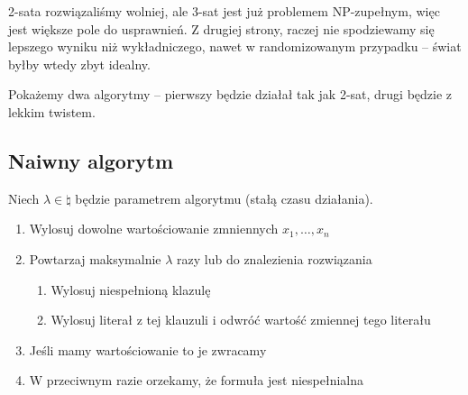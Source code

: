 2-sata rozwiązaliśmy wolniej, ale 3-sat jest już problemem NP-zupełnym, więc jest większe pole do usprawnień. Z drugiej strony, raczej nie spodziewamy się lepszego wyniku niż wykładniczego, nawet w randomizowanym przypadku -- świat byłby wtedy zbyt idealny.

Pokażemy dwa algorytmy -- pierwszy będzie działał tak jak 2-sat, drugi będzie z lekkim twistem.

\subsection{Naiwny algorytm}
\label{3-sat-naive-algorithm}
Niech \( \lambda \in \natural \) będzie parametrem algorytmu (stałą czasu działania).
\begin{enumerate}
	\item Wylosuj dowolne wartościowanie zmniennych \( x_1, \dots, x_n \)
	\item Powtarzaj maksymalnie \( \lambda \) razy lub do znalezienia rozwiązania
	      \begin{enumerate}
		      \item Wylosuj niespełnioną klazulę
		      \item Wylosuj literał z tej klauzuli i odwróć wartość zmiennej tego literału
	      \end{enumerate}
	\item Jeśli mamy wartościowanie to je zwracamy
	\item W przeciwnym razie orzekamy, że formuła jest niespełnialna
\end{enumerate}


